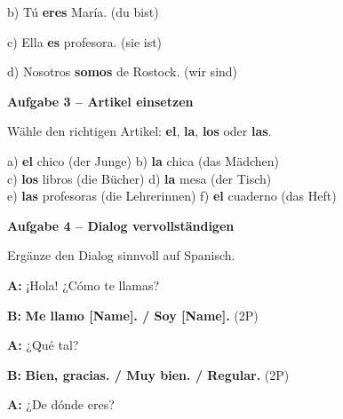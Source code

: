 \documentclass[11pt, a4paper]{article}
\newcommand{\fachfarbe}{spanisch}
\newcommand{\punktebox}[1]{\hfill\fbox{\small \_/#1}}
\newcommand{\lsg}[1]{\textcolor{loesung}{\textbf{#1}}}
\newenvironment{aufgabe}[1]{%
    \needspace{5\baselineskip}%
    \nopagebreak[4]%
    \vspace{10pt}
    \noindent\textbf{\textcolor{\fachfarbe}{Aufgabe #1}}
    \nopagebreak[4]%
    \vspace{5pt}
    \nopagebreak[4]%
    \begin{list}{}{\leftmargin=0pt}
    \item[]
}{%
    \end{list}
}
\newcommand{\es}[1]{\textcolor{\fachfarbe}{\textbf{#1}}}
\begin{document}
\vspace{0.8em}

\noindent
b) Tú \lsg{eres} María. \hfill (du bist)

\vspace{0.8em}

\noindent
c) Ella \lsg{es} profesora. \hfill (sie ist)

\vspace{0.8em}

\noindent
d) Nosotros \lsg{somos} de Rostock. \hfill (wir sind)

\vspace{15pt}

\begin{aufgabe}{3 -- Artikel einsetzen}
Wähle den richtigen Artikel: \es{el}, \es{la}, \es{los} oder \es{las}. \punktebox{6}
\end{aufgabe}

\noindent
a) \lsg{el} chico (der Junge) \hfill
b) \lsg{la} chica (das Mädchen) \\[0.8em]
c) \lsg{los} libros (die Bücher) \hfill
d) \lsg{la} mesa (der Tisch) \\[0.8em]
e) \lsg{las} profesoras (die Lehrerinnen) \hfill
f) \lsg{el} cuaderno (das Heft) \\

\vspace{15pt}

\begin{aufgabe}{4 -- Dialog vervollständigen}
Ergänze den Dialog sinnvoll auf Spanisch. \punktebox{6}
\end{aufgabe}

\noindent
\textbf{A:} ¡Hola! ¿Cómo te llamas?

\vspace{0.8em}

\noindent
\textbf{B:} \lsg{Me llamo [Name]. / Soy [Name].} \hfill (2P)

\vspace{0.8em}

\noindent
\textbf{A:} ¿Qué tal?

\vspace{0.8em}

\noindent
\textbf{B:} \lsg{Bien, gracias. / Muy bien. / Regular.} \hfill (2P)

\vspace{0.8em}

\noindent
\textbf{A:} ¿De dónde eres?

\vspace{0.8em}
\end{document}
